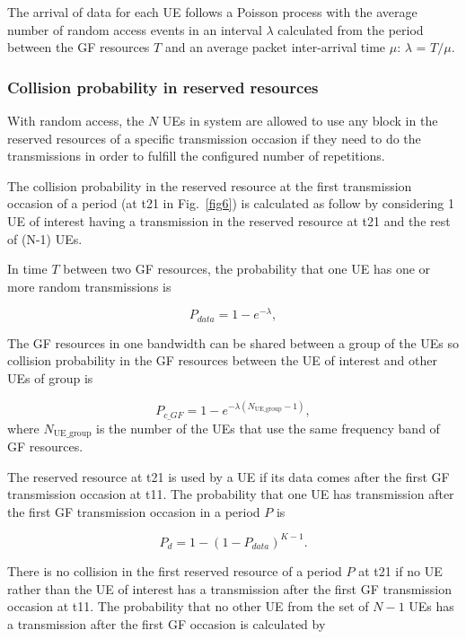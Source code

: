 \documentclass{ieeeaccess}
\begin{document}
The arrival of data for each UE follows a Poisson process with the average number of random access events in an interval $\lambda$ calculated from the period between the GF resources $T$ and an average packet inter-arrival time $\mu$: $\lambda$ = $T/\mu$.

\subsubsection{Collision probability in reserved resources}\label{IIIB3}

With random access, the $N$ UEs in system are allowed to use any block in the reserved resources of a specific transmission occasion if they need to do the transmissions in order to fulfill the configured number of repetitions.

The collision probability in the reserved resource at the first transmission occasion of a period (at t21 in Fig.~\ref{fig6}) is calculated as follow by considering 1 UE of interest having a transmission in the reserved resource at t21 and the rest of (N-1) UEs.

In time $T$ between two GF resources, the probability that one UE has one or more random transmissions is

\begin{equation}
P_{data} = 1 - e^{-\lambda},\label{eq1}
\end{equation}

The GF resources in one bandwidth can be shared between a group of the UEs so collision probability in the GF resources between the UE of interest and other UEs of group is 

\begin{equation}
P_{c\_GF} = 1 - e^{-\lambda(N_\mathrm{UE\_group}-1)},\label{eq2}
\end{equation}
where $N_\mathrm{UE\_group}$ is the number of the UEs that use the same frequency band of GF resources.

The reserved resource at t21 is used by a UE if its data comes after the first GF transmission occasion at t11. The probability that one UE has transmission after the first GF transmission occasion in a period $P$ is 

\begin{equation}
P_{d} = 1 - (1-P_{data})^{K-1}.\label{eq3}
\end{equation}

There is no collision in the first reserved resource of a period $P$ at t21 if no UE rather than the UE of interest has a transmission after the first GF transmission occasion at t11. The probability that no other UE from the set of $N-1$ UEs has a transmission after the first GF occasion is calculated by 
\end{document}
